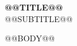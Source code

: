 \documentclass[9pt,a4paper]{article}
\begin{document}
\begin{center}
{\LARGE\bfseries @@TITLE@@}\\[1.5mm]
{\small @@SUBTITLE@@}
\end{center}
\vspace{1mm}
@@BODY@@
\end{document}

